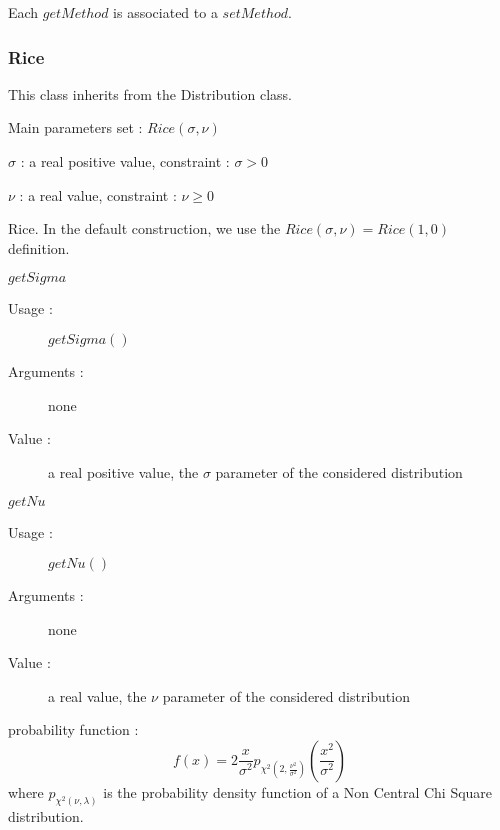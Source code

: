 Each  $getMethod$  is associated to a $setMethod$.

\newpage \subsubsection{Rice}

This class inherits from the Distribution class.

\begin{description}

\item[Usage :] Main parameters set : $Rice(\sigma, \nu)$

\item[Arguments :]  \rule{0pt}{1em}
  \begin{description}
  \item $\sigma$ :  a real positive value, constraint : $\sigma > 0$
  \item $\nu$ :  a real value, constraint : $\nu \geq 0$
  \end{description}

\item[Value :] Rice. In the default construction, we use the $Rice( \sigma, \nu) = Rice(1, 0)$ definition.

\item[Some methods :]  \rule{0pt}{1em}
  \begin{description}

  \item $getSigma$
    \begin{description}
    \item[Usage :] $getSigma()$
    \item[Arguments :] none
    \item[Value :]  a real positive value, the  $\sigma$ parameter of the considered distribution
    \end{description}
    \bigskip
  \item $getNu$
    \begin{description}
    \item[Usage :] $getNu()$
    \item[Arguments :] none
    \item[Value :]  a real value, the  $\nu$ parameter of the considered distribution
    \end{description}
    \bigskip
  \end{description}

\item[Details :]  \rule{0pt}{1em}
  \begin{description}
  \item probability function :
    $$
    f(x) =  \displaystyle 2\frac{x}{\sigma^2}p_{\chi^2(2,\frac{\nu^2}{\sigma^2})}(\frac{x^2}{\sigma^2})
    $$
    where $p_{\chi^2(\nu, \lambda)}$ is the probability density function of a Non Central Chi Square distribution.


\end{description}
\end{description}
